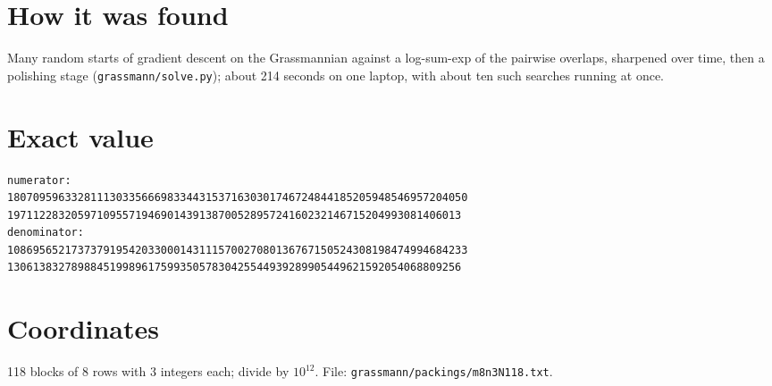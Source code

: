 \documentclass[11pt,a4paper]{article}
\begin{document}
\section{How it was found}
Many random starts of gradient descent on the Grassmannian against a log-sum-exp of the pairwise overlaps, sharpened over time, then a polishing stage (\texttt{grassmann/solve.py}); about 214 seconds on one laptop, with about ten such searches running at once.


\appendix
\section{Exact value}
{\small
\begin{verbatim}
numerator:
180709596332811130335666983344315371630301746724844185205948546957204050
19711228320597109557194690143913870052895724160232146715204993081406013
denominator:
108695652173737919542033000143111570027080136767150524308198474994684233
13061383278988451998961759935057830425544939289905449621592054068809256
\end{verbatim}}

\section{Coordinates}
118 blocks of 8 rows with 3 integers each; divide by $10^{12}$. File: \texttt{grassmann/packings/m8n3N118.txt}.
{\tiny
\begin{multicols}{3}
\end{multicols}}
\end{document}
